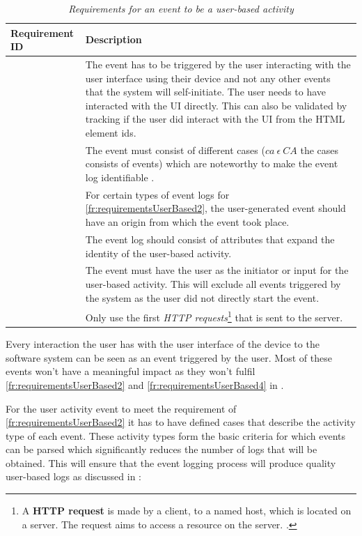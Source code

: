 \setcounter{phase}{1}
\setcounter{subphase}{1}
\begin{table}[!htb]
	\centering
	\caption[Requirements for an event to be a user-based activity]
	{\textit{Requirements for an event to be a user-based activity}}
	\label{tbl:ch2_requirementsForUserActivtyEvent}
	\begin{tabularx}{\textwidth}{|l|X|}
		\hline \textbf{Requirement ID} & \textbf{Description}\\
		\hline \subsubphase{fr:requirementsUserBased1} & The event has to be triggered by the user interacting with the user interface using their device and not any other events that the system will self-initiate. The user needs to have interacted with the UI directly. This can also be validated by tracking if the user did interact with the UI from the HTML element ids. \\
		\hline \subsubphase{fr:requirementsUserBased2} & The event must consist of different cases ($ca~ \epsilon~CA$ the cases consists of events) which are noteworthy to make the event log identifiable \cite{Slaninova2014}. \\
		\hline \subsubphase{fr:requirementsUserBased3} & For certain types of event logs for \ref{fr:requirementsUserBased2}, the user-generated event should have an origin from which the event took place. \\
		\hline \subsubphase{fr:requirementsUserBased4} & The event log should consist of attributes that expand the identity of the user-based activity. \\
		\hline \subsubphase{fr:requirementsUserBased5} & The event must have the user as the initiator or input for the user-based activity. This will exclude all events triggered by the system as the user did not directly start the event. \\
		\hline \subsubphase{fr:requirementsUserBased6} & Only use the first \textit{HTTP requests}\footnote{A \textbf{HTTP request} is made by a client, to a named host, which is located on a server. The request aims to access a resource on the server. \cite{IBM2021}.} that is sent to the server. \\ 
		\hline
	\end{tabularx}
\end{table}

Every interaction the user has with the user interface of the device to the software system can be seen as an event triggered by the user. Most of these events won't have a meaningful impact as they won't fulfil \ref{fr:requirementsUserBased2} and \ref{fr:requirementsUserBased4} in .\par For the user activity event to meet the requirement of \ref{fr:requirementsUserBased2} it has to have defined cases that describe the activity type of each event. These activity types form the basic criteria for which events can be parsed which significantly reduces the number of logs that will be obtained. This will ensure that the event logging process will produce quality user-based logs as discussed in :

